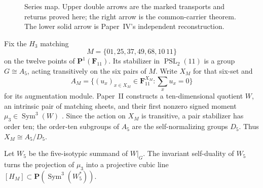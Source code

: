 \documentclass[11pt]{article}
\theoremstyle{definition}
\theoremstyle{remark}
\newcommand{\F}{\mathbf F}
\newcommand{\PP}{\mathbf P}
\newcommand{\Sym}{\operatorname{Sym}}
\begin{document}
\begin{figure}[ht]
\centering
{}
\caption{Series map.  Upper double arrows are the marked transports and
returns proved here; the right arrow is the common-carrier theorem.  The
lower solid arrow is Paper~IV's independent reconstruction.}
\label{fig:series-map}
\end{figure}

Fix the \(H_3\) matching
\[
 M=\{01,25,37,49,68,10\,11\}
\]
on the twelve points of \(\PP^1(\F_{11})\).  Its stabilizer in
\(\operatorname{PSL}_2(11)\) is a group \(G\cong A_5\), acting transitively
on the six pairs of \(M\).  Write \(X_M\) for that six-set and
\[
 A_M=\bigl\{(u_x)_{x\in X_M}\in\F_{11}^{X_M}:
                 \textstyle\sum_xu_x=0\bigr\}
\]
for its augmentation module.  Paper~II constructs a ten-dimensional
quotient \(W\), an intrinsic pair of matching sheets, and their first
nonzero signed moment \(\mu_3\in\Sym^3(W)\)
\cite{RuddFactorization2026}.
Since the action on \(X_M\) is transitive, a pair stabilizer has order ten;
the order-ten subgroups of \(A_5\) are the self-normalizing groups \(D_5\).
Thus \(X_M\cong A_5/D_5\).

Let \(W_5\) be the five-isotypic summand of \(W|_G\).  The invariant
self-duality of \(W_5\) turns the projection of \(\mu_3\) into a projective
cubic line \([H_M]\subset\PP(\Sym^3(W_5^*))\).
\end{document}
